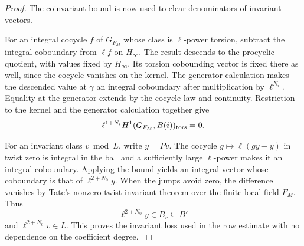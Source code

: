 \begin{proof}
The coinvariant bound is now used to clear denominators of invariant vectors.

For an integral cocycle \(f\) of \(G_{F_M}\) whose
class is \(\ell\)-power torsion, subtract the
integral coboundary from \(\ell f\) on \(H_\infty\).
The result descends to the procyclic quotient, with
values fixed by \(H_\infty\). Its torsion cobounding
vector is fixed there as well, since the cocycle
vanishes on the kernel. The generator calculation
makes the descended value at \(\gamma\) an integral
coboundary after multiplication by \(\ell^{N_i}\).
Equality at the generator extends by the cocycle
law and continuity. Restriction to the kernel and the generator calculation together give
\[
 \ell^{1+N_i}H^1(G_{F_M},B(i))_{\rm tors}=0.
\]

\label{cor:ramified-cyclotomic-4}

For an invariant class \(v\bmod L\), write \(y=Pv\).
The cocycle \(g\mapsto\ell(gy-y)\) in twist zero is
integral in the ball and a sufficiently large
\(\ell\)-power makes it an integral coboundary.
Applying the bound yields an integral vector whose
coboundary is that of \(\ell^{2+N_0}y\).
When the jumps avoid zero, the difference vanishes
by Tate's nonzero-twist invariant theorem over the
finite local field \(F_M\).
Thus
\[
 \ell^{2+N_0}y\in B_r\subseteq B'
\]
and \(\ell^{2+N_0}v\in L\).
This proves the invariant loss used in the row
estimate with no dependence on the coefficient degree.
\cite[Theorem 2]{tate-pdivisible}
\end{proof}

